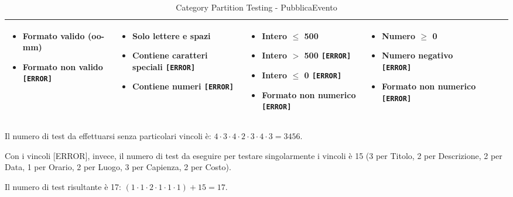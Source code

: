 \begin{table}[H]
\begin{tabularx}{\textwidth}{|X|X|X|X|X|X|X|}
		\parbox[t]{\linewidth}{\begin{itemize}[leftmargin=*]
			\item Formato valido (oo-mm) \checkmark
			\item Formato non valido \texttt{[ERROR]}
		\end{itemize}} &

		\parbox[t]{\linewidth}{\begin{itemize}[leftmargin=*]
			\item Solo lettere e spazi \checkmark
			\item Contiene caratteri speciali \texttt{[ERROR]}
			\item Contiene numeri \texttt{[ERROR]}
		\end{itemize}} &

		\parbox[t]{\linewidth}{\begin{itemize}[leftmargin=*]
			\item Intero $\leq$ 500 \checkmark
			\item Intero $>$ 500 \texttt{[ERROR]}
			\item Intero $\leq$ 0 \texttt{[ERROR]}
			\item Formato non numerico \texttt{[ERROR]}
		\end{itemize}} &

		\parbox[t]{\linewidth}{\begin{itemize}[leftmargin=*]
			\item Numero $\geq$ 0 \checkmark
			\item Numero negativo \texttt{[ERROR]}
			\item Formato non numerico \texttt{[ERROR]}
		\end{itemize}} \\
		\hline
	\end{tabularx}
	\caption{Category Partition Testing - PubblicaEvento}
\end{table}

\noindent Il numero di test da effettuarsi senza particolari vincoli è: $4 \cdot 3 \cdot 4 \cdot 2 \cdot 3 \cdot 4 \cdot 3 = 3456$.

\noindent Con i vincoli [ERROR], invece, il numero di test da eseguire per testare singolarmente i vincoli è 15 (3 per Titolo, 2 per Descrizione, 2 per Data, 1 per Orario, 2 per Luogo, 3 per Capienza, 2 per Costo).

\noindent Il numero di test risultante è 17: $(1 \cdot 1 \cdot 2\cdot 1 \cdot 1 \cdot 1) + 15 = 17$.



